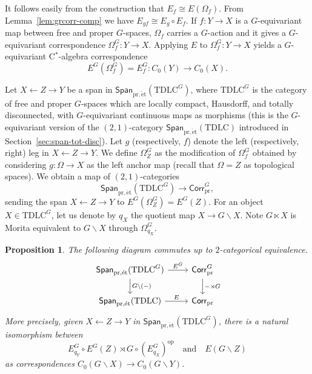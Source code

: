 \documentclass[a4paper,reqno]{amsart}
\theoremstyle{plain}
\newtheorem{proposition}[theorem]{Proposition}
\theoremstyle{definition}
\theoremstyle{remark}
\numberwithin{equation}{section}
\newcommand{\Span}{\mathsf{Span}}
\newcommand{\PrCorr}{\mathsf{Corr}_{\mathrm{pr}}}
\newcommand{\pret}{\mathrm{pr,\acute{e}t}}
\newcommand{\TDLC}{\mathrm{TDLC}}
\begin{document}
It follows easily from the construction that $E_f \cong E(\Omega_f)$. From Lemma~\ref{lem:grcorr-comp} we have $E_{gf}\cong E_g\circ E_f$. If $f\colon Y\to X$ is a $G$-equivariant map between free and proper $G$-spaces, $\Omega_f$ carries a $G$-action and it gives a $G$-equivariant correspondence $\Omega^G_f\colon Y\to X$. Applying $E$ to  $\Omega^G_f\colon Y\to X$ yields a $G$-equivariant C$^*$-algebra correspondence
\[
E^G(\Omega^G_f)=E^G_f \colon C_0(Y)\to C_0(X).
\]

Let $X \leftarrow Z \to Y$ be a span in $\Span_{\pret}(\TDLC^G)$, where $\TDLC^G$ is the category of free and proper $G$-spaces which are locally compact, Hausdorff, and totally disconnected, with $G$-equivariant continuous maps as morphisms (this is the $G$-equivariant version of the $(2,1)$-category $\Span_{\pret}(\TDLC)$ introduced in Section~\ref{sec:span-tot-disc}). Let $g$ (respectively, $f$) denote the left (respectively, right) leg in $X \leftarrow Z \to Y$. We define $\Omega^G_Z$ as the modification of $\Omega^G_f$ obtained by considering $g\colon \Omega\to X$ as the left anchor map (recall that $\Omega=Z$ as topological spaces). We obtain a map of $(2,1)$-categories 
\[
\Span_{\pret}(\TDLC^G) \to \PrCorr^G,
\]
sending the span $X \leftarrow Z \to Y$ to $E^G(\Omega^G_Z)=E^G(Z)$. For an object $X\in \TDLC^G$, let us denote by $q_X$ the quotient map $X\to G\backslash X$. Note $G\ltimes X$ is Morita equivalent to $G\backslash X$ through $\Omega^G_{q_X}$. 

\begin{proposition}\label{prop:span-corr-comm}
The following diagram commutes up to $2$-categorical equivalence.
\[
\begin{tikzcd}
\Span_{\pret}(\TDLC^G) \arrow[r, "E^G"] \arrow[d, "G\backslash(-)"] & \PrCorr^G \arrow[d, "- \rtimes G"] \\
\Span_{\pret}(\TDLC) \arrow[r, "E"]                 & \PrCorr               
\end{tikzcd}
\]
More precisely, given  $X \leftarrow Z \to Y$ in $\Span_{\pret}(\TDLC^G)$, there is a natural isomorphism between 
\[
E^G_{q_Y} \circ  E^G(Z)\rtimes G \circ (E^G_{q_X})^{\mathrm{op}}\quad \mathrm{ and } \quad E(G\backslash Z)
\]
as correspondences $C_0(G\backslash X)\to C_0(G\backslash Y)$.
\end{proposition} 
\end{document}
